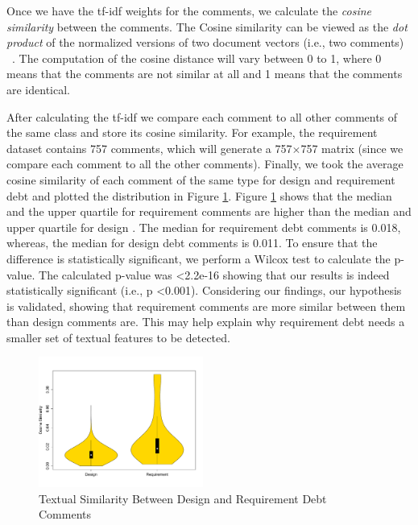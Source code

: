Once we have the tf-idf weights for the comments, we calculate the \textit{cosine similarity} between the comments. The Cosine similarity can be viewed as the \textit{dot product} of the normalized versions of two document vectors (i.e., two comments) ~\cite{Manning2008book}. The computation of the cosine distance will vary between 0 to 1, where 0 means that the comments are not similar at all and 1 means that the comments are identical.

After calculating the tf-idf we compare each comment to all other comments of the same class and store its cosine similarity. For example, the requirement \SATD dataset contains 757 comments, which will generate a 757$\times$757 matrix (since we compare each comment to all the other comments). Finally, we took the average cosine similarity of each comment of the same type for design and requirement debt and plotted the distribution in Figure \ref{fig:textual_similarity}. Figure \ref{fig:textual_similarity} shows that the median and the upper quartile for requirement \SATD comments are higher than the median and upper quartile for design \SATD. The median for requirement debt comments is 0.018, whereas, the median for design debt comments is 0.011. To ensure that the difference is statistically significant, we perform a Wilcox test to calculate the p-value. The calculated p-value was \textless 2.2e-16 showing that our results is indeed statistically significant (i.e., p \textless 0.001). Considering our findings, our hypothesis is validated, showing that requirement \SATD comments are more similar between them than design \SATD comments are. This may help explain why requirement debt needs a smaller set of textual features to be detected.

\begin{figure}[t]
  \centering
  \includegraphics[width = 0.48\textwidth]{figures/textual_similarity_removing_stop_words.pdf}
  \vspace{-3mm}
  \caption{Textual Similarity Between Design and Requirement Debt Comments}
  \label{fig:textual_similarity}
\end{figure}

